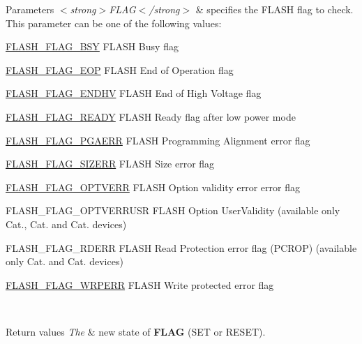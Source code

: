 \begin{DoxyParams}{Parameters}
{\em $<$strong$>$\-F\-L\-A\-G$<$/strong$>$} & specifies the F\-L\-A\-S\-H flag to check. This parameter can be one of the following values\-: \begin{DoxyItemize}
\item \hyperlink{group___f_l_a_s_h___flags_gad3bc368f954ad7744deda3315da2fff7}{F\-L\-A\-S\-H\-\_\-\-F\-L\-A\-G\-\_\-\-B\-S\-Y} F\-L\-A\-S\-H Busy flag \item \hyperlink{group___f_l_a_s_h___flags_gaf043ba4d8f837350bfc7754a99fae5a9}{F\-L\-A\-S\-H\-\_\-\-F\-L\-A\-G\-\_\-\-E\-O\-P} F\-L\-A\-S\-H End of Operation flag \item \hyperlink{group___f_l_a_s_h___flags_ga9979b826ad18f10a565f5c0bbab2cd98}{F\-L\-A\-S\-H\-\_\-\-F\-L\-A\-G\-\_\-\-E\-N\-D\-H\-V} F\-L\-A\-S\-H End of High Voltage flag \item \hyperlink{group___f_l_a_s_h___flags_gacc11026963ab32982bb4811bd409c06f}{F\-L\-A\-S\-H\-\_\-\-F\-L\-A\-G\-\_\-\-R\-E\-A\-D\-Y} F\-L\-A\-S\-H Ready flag after low power mode \item \hyperlink{group___f_l_a_s_h___flags_ga2c3f4dbea065f8ea2987eada4dab30bd}{F\-L\-A\-S\-H\-\_\-\-F\-L\-A\-G\-\_\-\-P\-G\-A\-E\-R\-R} F\-L\-A\-S\-H Programming Alignment error flag \item \hyperlink{group___f_l_a_s_h___flags_gac20909664e371d2ca0436a055393f9c4}{F\-L\-A\-S\-H\-\_\-\-F\-L\-A\-G\-\_\-\-S\-I\-Z\-E\-R\-R} F\-L\-A\-S\-H Size error flag \item \hyperlink{group___f_l_a_s_h___flags_gacb2c4c991a260c3f110cd8c72f302864}{F\-L\-A\-S\-H\-\_\-\-F\-L\-A\-G\-\_\-\-O\-P\-T\-V\-E\-R\-R} F\-L\-A\-S\-H Option validity error error flag \item F\-L\-A\-S\-H\-\_\-\-F\-L\-A\-G\-\_\-\-O\-P\-T\-V\-E\-R\-R\-U\-S\-R F\-L\-A\-S\-H Option User\-Validity (available only Cat., Cat. and Cat. devices) \item F\-L\-A\-S\-H\-\_\-\-F\-L\-A\-G\-\_\-\-R\-D\-E\-R\-R F\-L\-A\-S\-H Read Protection error flag (P\-C\-R\-O\-P) (available only Cat. and Cat. devices) \item \hyperlink{group___f_l_a_s_h___flags_ga6abf64f916992585899369166db3f266}{F\-L\-A\-S\-H\-\_\-\-F\-L\-A\-G\-\_\-\-W\-R\-P\-E\-R\-R} F\-L\-A\-S\-H Write protected error flag \end{DoxyItemize}
\\
\hline
\end{DoxyParams}

\begin{DoxyRetVals}{Return values}
{\em The} & new state of {\bfseries F\-L\-A\-G} (S\-E\-T or R\-E\-S\-E\-T). \\
\hline
\end{DoxyRetVals}
